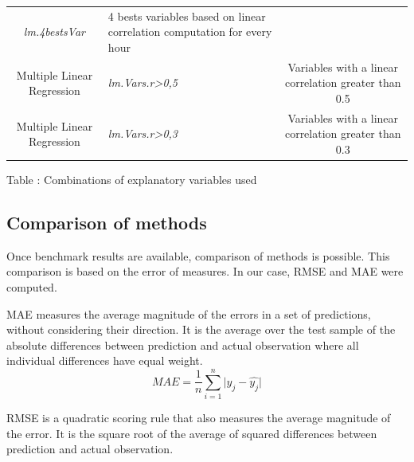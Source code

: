 \documentclass[12pt,twoside]{reedthesis}
\theoremstyle{definition}
\theoremstyle{definition}
\theoremstyle{definition}
\theoremstyle{remark}
\begin{document}
\begin{longtable}[]{@{}clc@{}}
\begin{minipage}[t]{0.21\columnwidth}
\emph{lm.4bestsVar}\strut
\end{minipage} & \begin{minipage}[t]{0.52\columnwidth}\centering\strut
4 bests variables based on linear correlation computation for every
hour\strut
\end{minipage}\tabularnewline
\begin{minipage}[t]{0.18\columnwidth}\centering\strut
Multiple Linear Regression\strut
\end{minipage} & \begin{minipage}[t]{0.21\columnwidth}\raggedright\strut
\emph{lm.Vars.r\textgreater{}0,5}\strut
\end{minipage} & \begin{minipage}[t]{0.52\columnwidth}\centering\strut
Variables with a linear correlation greater than 0.5\strut
\end{minipage}\tabularnewline
\begin{minipage}[t]{0.18\columnwidth}\centering\strut
Multiple Linear Regression\strut
\end{minipage} & \begin{minipage}[t]{0.21\columnwidth}\raggedright\strut
\emph{lm.Vars.r\textgreater{}0,3}\strut
\end{minipage} & \begin{minipage}[t]{0.52\columnwidth}\centering\strut
Variables with a linear correlation greater than 0.3\strut
\end{minipage}\tabularnewline
\bottomrule
\end{longtable}
Table : \label{tab:explvar} Combinations of explanatory variables used

\subsection{Comparison of methods}\label{comparison-of-methods}

Once benchmark results are available, comparison of methods is possible.
This comparison is based on the error of measures. In our case, RMSE and
MAE were computed.

MAE measures the average magnitude of the errors in a set of
predictions, without considering their direction. It is the average over
the test sample of the absolute differences between prediction and
actual observation where all individual differences have equal weight.
\[
MAE = \frac{1}{n} \sum_{i=1}^{n}{ \lvert y_{j} - \widehat{y_{j}} \rvert}
\]

RMSE is a quadratic scoring rule that also measures the average
magnitude of the error. It is the square root of the average of squared
differences between prediction and actual observation.
\end{document}
